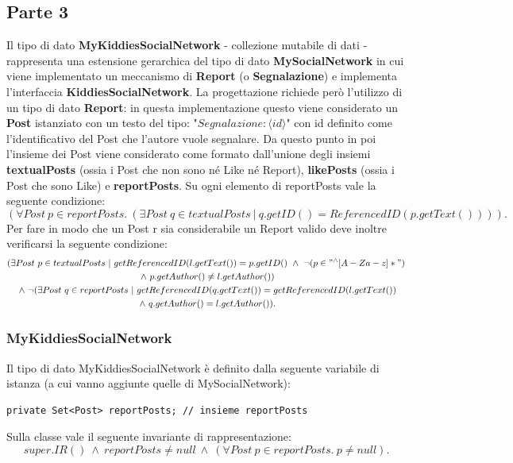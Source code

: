 \documentclass[10pt, italian, openany]{book}
\begin{document}
\subsection{Parte 3}
Il tipo di dato \textbf{MyKiddiesSocialNetwork} - collezione mutabile di dati - rappresenta una estensione gerarchica del tipo di dato \textbf{MySocialNetwork} in cui viene implementato un meccanismo di \textbf{Report} (o \textbf{Segnalazione}) e implementa l'interfaccia \textbf{KiddiesSocialNetwork}. La progettazione richiede per\`o l'utilizzo di un tipo di dato \textbf{Report}:
in questa implementazione questo viene considerato un \textbf{Post} istanziato con un testo del tipo: "\(Segnalazione: \langle id \rangle\)" con id definito come l'identificativo del Post che l'autore vuole segnalare.
Da questo punto in poi l'insieme dei Post viene considerato come formato dall'unione degli insiemi \textbf{textualPosts} (ossia i Post che non sono n\'e Like n\'e Report), \textbf{likePosts} (ossia i Post che sono Like) e \textbf{reportPosts}.
Su ogni elemento di reportPosts vale la seguente condizione:
\[ (\forall Post \ p \in reportPosts. \ (\exists Post \ q \in textualPosts \ | \ q.getID() = ReferencedID(p.getText()))). \]
Per fare in modo che un Post r sia considerabile un Report valido deve inoltre verificarsi la seguente condizione:
\begin{gather*}
(\exists Post \ p \in textualPosts \ | \ getReferencedID(l.getText()) = p.getID() \ \wedge \ \neg (p \in "^\wedge [A-Za-z]*") \\ 
\ \wedge \ p.getAuthor() \neq l.getAuthor()) \\
\ \wedge \ \neg(\exists Post \ q \in reportPosts \ | \ getReferencedID(q.getText()) = getReferencedID(l.getText()) \\
\ \wedge \ q.getAuthor() = l.getAuthor()).
\end{gather*}

\subsubsection{MyKiddiesSocialNetwork}
Il tipo di dato MyKiddiesSocialNetwork \`e definito dalla seguente variabile di istanza (a cui vanno aggiunte quelle di MySocialNetwork):
\begin{lstlisting}[style=codeStyle]
private Set<Post> reportPosts; // insieme reportPosts
\end{lstlisting}
Sulla classe vale il seguente invariante di rappresentazione:
\[ super.IR() \ \wedge \ reportPosts \neq null \ \wedge \ (\forall Post \ p \in reportPosts. \ p \neq null). \]
\end{document}
